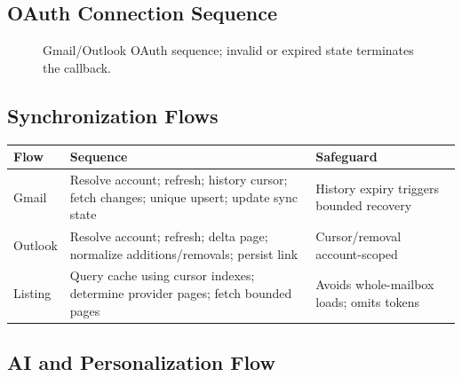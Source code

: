 \documentclass[11pt]{article}
\begin{document}
\subsection{OAuth Connection Sequence}

\begin{figure}[htbp]
\centering
{}
\caption{Gmail/Outlook OAuth sequence; invalid or expired state terminates the callback.}
\end{figure}

\subsection{Synchronization Flows}

\begin{longtable}{@{}p{}p{}p{}@{}}
\toprule
Flow & Sequence & Safeguard \\
\midrule
\endhead
\bottomrule
\endlastfoot
Gmail & Resolve account; refresh; history cursor; fetch changes; unique upsert; update sync state & History expiry triggers bounded recovery \\
Outlook & Resolve account; refresh; delta page; normalize additions/removals; persist link & Cursor/removal account-scoped \\
Listing & Query cache using cursor indexes; determine provider pages; fetch bounded pages & Avoids whole-mailbox loads; omits tokens \\
\end{longtable}

\subsection{AI and Personalization Flow}
\end{document}
